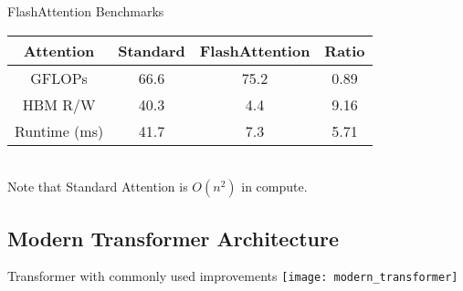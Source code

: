 \begin{frame}[c]{FlashAttention Benchmarks}
    \large
    \begin{tabular}{c|ccc}
        Attention & Standard & FlashAttention & Ratio \\ \hline
        GFLOPs & 66.6  & 75.2 & 0.89 \\
        HBM R/W & 40.3 & 4.4 & 9.16 \\
        Runtime (ms) & 41.7 & 7.3 & 5.71 \\
    \end{tabular} \newline \newline
    \normalsize
     \\
    \large
    Note that Standard Attention is $O(n^2)$ in compute.
\end{frame}

\subsection{Modern Transformer Architecture}

\begin{frame}[c]{Transformer with commonly used improvements}
    \texttt{[image: modern\_transformer]}
\end{frame}

